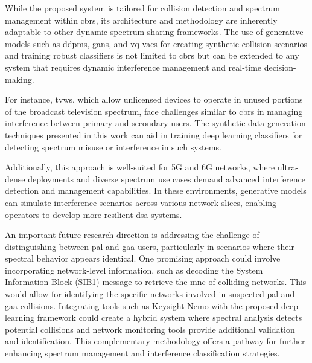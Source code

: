 While the proposed system is tailored for collision detection and spectrum management within \gls{cbrs}, its architecture and methodology are inherently adaptable to other dynamic spectrum-sharing frameworks. The use of generative models such as \gls{ddpm}s, \gls{gan}s, and \gls{vq-vae}s for creating synthetic collision scenarios and training robust classifiers is not limited to \gls{cbrs} but can be extended to any system that requires dynamic interference management and real-time decision-making.  

For instance, \gls{tvws}\cite{13}, which allow unlicensed devices to operate in unused portions of the broadcast television spectrum, face challenges similar to \gls{cbrs} in managing interference between primary and secondary users. The synthetic data generation techniques presented in this work can aid in training deep learning classifiers for detecting spectrum misuse or interference in such systems.  

Additionally, this approach is well-suited for 5G and 6G networks, where ultra-dense deployments and diverse spectrum use cases demand advanced interference detection and management capabilities. In these environments, generative models can simulate interference scenarios across various network slices, enabling operators to develop more resilient \gls{dsa} systems.  

An important future research direction is addressing the challenge of distinguishing between \gls{pal} and \gls{gaa} users, particularly in scenarios where their spectral behavior appears identical. One promising approach could involve incorporating network-level information, such as decoding the System Information Block (SIB1)  message to retrieve the \gls{mnc} of colliding networks. This would allow for identifying the specific networks involved in suspected \gls{pal} and \gls{gaa} collisions. Integrating tools such as Keysight Nemo with the proposed deep learning framework could create a hybrid system where spectral analysis detects potential collisions and network monitoring tools provide additional validation and identification. This complementary methodology offers a pathway for further enhancing spectrum management and interference classification strategies. 

